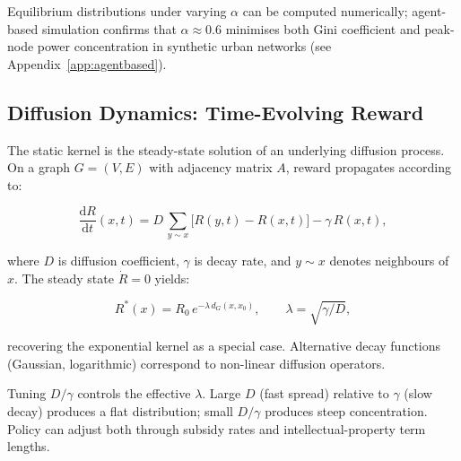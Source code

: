 \documentclass[12pt,a4paper]{article}
\theoremstyle{definition}
\newcommand{\ddt}[1]{\frac{\mathrm{d}#1}{\mathrm{d}t}}
\begin{document}
Equilibrium distributions under varying $\alpha$ can be computed numerically;
agent-based simulation confirms that $\alpha \approx 0.6$ minimises both
Gini coefficient and peak-node power concentration in synthetic urban networks
(see Appendix~\ref{app:agentbased}).

\subsection{Diffusion Dynamics: Time-Evolving Reward}

The static kernel is the steady-state solution of an underlying diffusion
process.  On a graph $G = (V, E)$ with adjacency matrix $A$, reward
propagates according to:

\begin{equation}
  \ddt{R}(x,t) = D\,\sum_{y \sim x} \bigl[R(y,t) - R(x,t)\bigr]
               - \gamma\,R(x,t),
  \label{eq:diffusion}
\end{equation}

where $D$ is diffusion coefficient, $\gamma$ is decay rate, and $y \sim x$
denotes neighbours of $x$.  The steady state $\dot{R} = 0$ yields:

\begin{equation}
  R^*(x) = R_0\,e^{-\lambda\,d_G(x,x_0)}, \qquad
  \lambda = \sqrt{\gamma / D},
\end{equation}

recovering the exponential kernel as a special case.  Alternative decay
functions (Gaussian, logarithmic) correspond to non-linear diffusion operators.

\begin{tcolorbox}[policybox]
  Tuning $D/\gamma$ controls the effective $\lambda$.  Large $D$ (fast spread)
  relative to $\gamma$ (slow decay) produces a flat distribution; small
  $D/\gamma$ produces steep concentration.  Policy can adjust both through
  subsidy rates and intellectual-property term lengths.
\end{tcolorbox}
\end{document}
